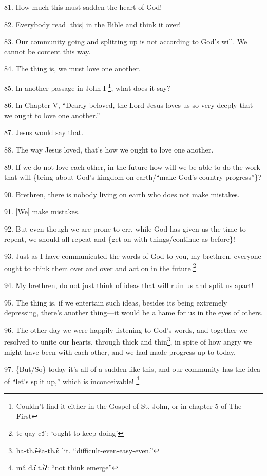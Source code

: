 81. How much this must sadden the heart of God!

82. Everybody read [this] in the Bible and think it over!

83. Our community going and splitting up is not according to God's will. We cannot
be content this way.

84. The thing is, we must love one another.

85. In another passage in John I \footnote{Couldn't find it either in the Gospel of St. John, or in chapter 5 of The First}, what does it say?

86. In Chapter V, ``Dearly beloved, the Lord Jesus loves us so very deeply that
we ought to love one another.''

87. Jesus would say that.

88. The way Jesus loved, that's how we ought to love one another.

89. If we do not love each other, in the future how will we be able to do the work
that will \{bring about God's kingdom on earth/``make God's country progress''\}?

90. Brethren, there is nobody living on earth who does not make mistakes.

91. [We] make mistakes.

92. But even though we are prone to err, while God has given us the time to repent,
we should all repeat and \{get on with things/continue as before\}!

93. Just as I have communicated the words of God to you, my brethren, everyone
ought to think them over and over and act on in the future.\footnote{te qay cɔ̂ : `ought to keep doing'}

94. My brethren, do not just think of ideas that will ruin us and split us apart!

95. The thing is, if we entertain such ideas, besides its being extremely depressing,
there's another thing---it would be a hame for us in the eyes of others.

96. The other day we were happily listening to God's words, and together we resolved
to unite our hearts, through thick and thin\footnote{hā-thɔ̂-ša-thɔ̂: lit. ``difficult-even-easy-even.''}, in spite of how angry we might
have been with each other, and we had made progress up to today.

97. \{But/So\} today it's all of a sudden like this, and our community has the
idea of ``let's split up,'' which is inconceivable! \footnote{mâ dɔ̂ tɔ̀ʔ: ``not think emerge''}

